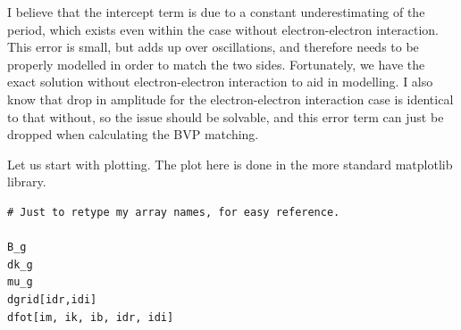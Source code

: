 \documentclass[11pt]{article}
\makeatletter
\newcommand{\boxspacing}{\kern\kvtcb@left@rule\kern\kvtcb@boxsep}
\newcommand{\prompt}[4]{
        {\ttfamily\llap{{\color{#2}[#3]:\hspace{3pt}#4}}\vspace{-\baselineskip}}
    }
\makeatother
\begin{document}
I believe that the intercept term is due to a constant underestimating
of the period, which exists even within the case without
electron-electron interaction. This error is small, but adds up over
oscillations, and therefore needs to be properly modelled in order to
match the two sides. Fortunately, we have the exact solution without
electron-electron interaction to aid in modelling. I also know that drop
in amplitude for the electron-electron interaction case is identical to
that without, so the issue should be solvable, and this error term can
just be dropped when calculating the BVP matching.

    Let us start with plotting. The plot here is done in the more standard
matplotlib library.
    \begin{tcolorbox}[breakable, size=fbox, boxrule=1pt, pad at break*=1mm,colback=cellbackground, colframe=cellborder]
\prompt{In}{incolor}{41}{\boxspacing}
\begin{Verbatim}[commandchars=\\\{\}]
# Just to retype my array names, for easy reference.

B_g
dk_g 
mu_g
dgrid[idr,idi]
dfot[im, ik, ib, idr, idi]
\end{Verbatim}
\end{tcolorbox}
\end{document}
